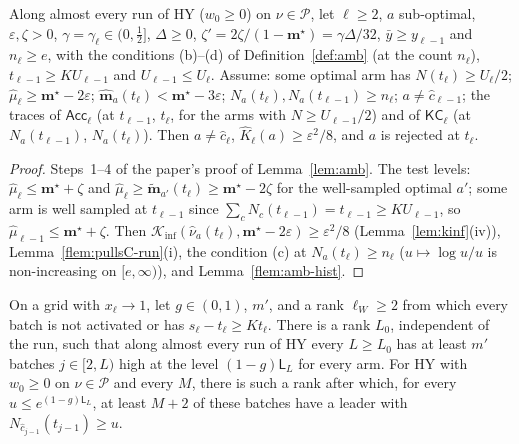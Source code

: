\documentclass[11pt]{article}
\newcommand{\Kinf}{\mathcal K_{\inf}}
\newcommand{\cP}{\mathcal P}
\begin{document}
\begin{lemma}[the consistency test when $x=1$, on a run]\label{flem:amb-run}
Along almost every run of HY ($w_0\ge0$) on $\nu\in\cP$, let $\ell\ge2$, $a$ sub-optimal, $\varepsilon,\zeta>0$,
$\gamma=\gamma_\ell\in(0,\frac12]$, $\Delta\ge0$, $\zeta'=2\zeta/(1-\mathbf m^\star)=\gamma\Delta/32$, $\bar y\ge y_{\ell-1}$ and
$n_\ell\ge e$, with the conditions (b)--(d) of Definition~\ref{def:amb} (at the count $n_\ell$),
$t_{\ell-1}\ge KU_{\ell-1}$ and $U_{\ell-1}\le U_\ell$. Assume: some optimal arm has $N(t_\ell)\ge U_\ell/2$;
$\hat\mu_\ell\ge\mathbf m^\star-2\varepsilon$; $\hat{\mathbf m}_a(t_\ell)<\mathbf m^\star-3\varepsilon$; $N_a(t_\ell),N_a(t_{\ell-1})\ge n_\ell$;
$a\ne\hat c_{\ell-1}$; the traces of $\mathsf{Acc}_\ell$ (at $t_{\ell-1}$, $t_\ell$, for the arms with $N\ge U_{\ell-1}/2$) and
of $\mathsf{KC}_\ell$ (at $N_a(t_{\ell-1})$, $N_a(t_\ell)$). Then $a\ne\hat c_\ell$, $\hat K_\ell(a)\ge\varepsilon^2/8$, and $a$ is
rejected at $t_\ell$.
\end{lemma}

\begin{proof}
Steps~1--4 of the paper's proof of Lemma~\ref{lem:amb}. The test levels: $\hat\mu_\ell\le\mathbf m^\star+\zeta$ and
$\hat\mu_\ell\ge\tilde{\mathbf m}_{a'}(t_\ell)\ge\mathbf m^\star-2\zeta$ for the well-sampled optimal $a'$; some arm is well
sampled at $t_{\ell-1}$ since $\sum_cN_c(t_{\ell-1})=t_{\ell-1}\ge KU_{\ell-1}$, so $\hat\mu_{\ell-1}\le\mathbf m^\star+\zeta$. Then
$\Kinf(\hat\nu_a(t_\ell),\mathbf m^\star-2\varepsilon)\ge\varepsilon^2/8$ (Lemma~\ref{lem:kinf}(iv)), Lemma~\ref{flem:pullsC-run}(i), the
condition (c) at $N_a(t_\ell)\ge n_\ell$ ($u\mapsto\log u/u$ is non-increasing on $[e,\infty)$), and
Lemma~\ref{flem:amb-hist}.
\end{proof}

\begin{lemma}[many good high batches when $x=1$, on a run]\label{flem:levelC-run}
On a grid with $x_\ell\to1$, let $g\in(0,1)$, $m'$, and a rank $\ell_W\ge2$ from which every batch is
not activated or has $s_\ell-t_\ell\ge Kt_\ell$. There is a rank $L_0$, independent of the run, such
that along almost every run of HY every $L\ge L_0$ has at least $m'$ batches $j\in[2,L)$ high at the
level $(1-g)\mathsf L_L$ for every arm. For HY with $w_0\ge0$ on $\nu\in\cP$ and every $M$, there is such
a rank after which, for every $u\le e^{(1-g)\mathsf L_L}$, at least $M+2$ of these batches have a leader
with $N_{\hat c_{j-1}}(t_{j-1})\ge u$.
\end{lemma}
\end{document}
